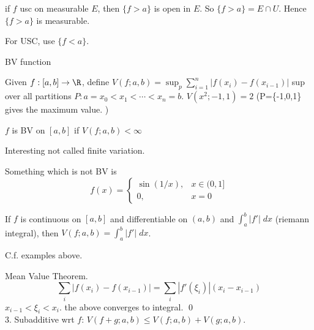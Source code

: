 \pf if $f$ usc on measurable $E$, then $\{f>a\}$ is open in $E$. So $\{f>a\}=E \cap U$. Hence $\{f>a\}$ is measurable.

For USC, use $\{f<a\}$.







BV function

Given $f: [a,b] \to \R$, define $V(f; a,b)=\sup_p \sum_{i=1}^n |f(x_i)-f(x_{i-1})|$ sup over all partitions $P:a=x_0<x_1<\cdots<x_n=b$. $V(x^2; -1,1)=2$ (P=\{-1,0,1\} gives the maximum value. ) 


\begin{dfn}
$f$ is BV on $[a,b]$ if $V(f; a,b)<\infty$
\end{dfn}

Interesting not called finite variation. 


Something which is not BV is 
	\[
	f(x)=
	\begin{cases}
	\sin(1/x), & x \in (0,1] \\
	0, & x=0
	\end{cases}
	\]



\begin{thm}
If $f$ is continuous on $[a,b]$ and differentiable on $(a,b)$ and $\int_a^b |f'| \; dx$ (riemann integral), then $V(f;a,b)= \int_a^b |f'| \; dx$.
\end{thm}

C.f. examples above. 


\pf Mean Value Theorem. 
	\[
	\sum_i |f(x_i) - f(x_{i-1})| = \sum_i |f'(\xi_i)| (x_i-x_{i-1})
	\]
$x_{i-1}< \xi_i < x_i$. the above converges to integral. \qed \\

3. Subadditive wrt $f$:
$V(f+g; a,b) \leq V(f; a,b) + V(g; a,b)$. 

